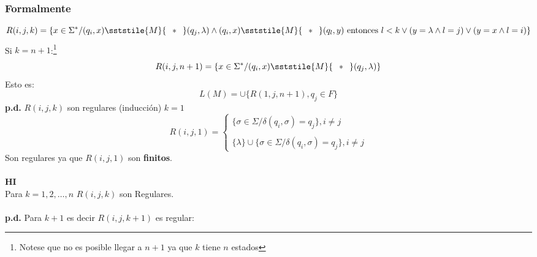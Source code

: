 \begin{enumerate}
\subsubsection*{Formalmente}
$$R(i,j,k)= \{ x\in\Sigma^* / (q_i,x)\sststile{M}{\hspace{0.25cm} * \hspace{0.25cm}} (q_j,\lambda) \wedge (q_i,x) \sststile{M}{\hspace{0.25cm} * \hspace{0.25cm}} (q_l,y) \text{ entonces } l<k \vee (y=\lambda \wedge l=j) \vee (y=x \wedge l=i) \}
$$
Si $k=n+1$:\footnote{Notese que no es posible llegar a $n+1$ ya que $k$ tiene $n$ estados}
$$
R(i,j,n+1)=\{ x\in\Sigma^* / (q_i,x) \sststile{M}{\hspace{0.25cm} * \hspace{0.25cm}} (q_j,\lambda)\}
$$
Esto es:
$$
L(M) = \cup\{ R(1,j,n+1),q_j \in F \}
$$
\textbf{p.d.} $R(i,j,k)$ son regulares (inducción) $k=1$
$$
R(i,j,1) =
\begin{cases}
\{ \sigma\in\Sigma / \delta(q_i,\sigma)=q_j \},  i\neq j \\ \\
\{\lambda \} \cup \{ \sigma\in\Sigma / \delta(q_i,\sigma)=q_j \} , i\neq j
\end{cases}
$$
Son regulares ya que $R(i,j,1)$ son \textbf{finitos}. \\${ }$\\
\textbf{HI} \\
Para $k=1,2,\ldots,n$ $R(i,j,k)$ son Regulares. \\${ }$\\
\textbf{p.d.} Para $k+1$ es decir $R(i,j,k+1)$ es regular:

\begin{figure}[H]
\centering
{}
\end{figure}
\end{enumerate}
